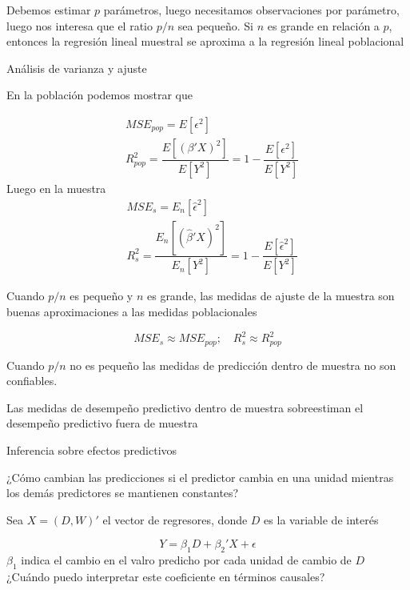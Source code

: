 \documentclass[aspectratio=169,xcolor=dvipsnames]{beamer}
\begin{document}
\begin{frame}
Debemos estimar $p$ parámetros, luego necesitamos observaciones por parámetro, luego nos interesa que el ratio $p/n$ sea pequeño. Si $n$ es grande en relación a $p$, entonces la regresión lineal muestral se aproxima a la regresión lineal poblacional
    
\end{frame}

\begin{frame}{Análisis de varianza y ajuste}

En la población podemos mostrar que 

\begin{align*}
    &MSE_{pop}=E[\epsilon^2]\\
    &R^2_{pop}=\dfrac{E[(\beta'X)^2]}{E[Y^2]}=1-\dfrac{E[\epsilon^2]}{E[Y^2]}
\end{align*}
Luego en la muestra
\begin{align*}
&MSE_{s}=E_n[\hat{\epsilon}^2]\\
    &R^2_{s}=\dfrac{E_n[(\hat{\beta}'X)^2]}{E_n[Y^2]}=1-\dfrac{E[\hat{\epsilon}^2]}{E[Y^2]}    
\end{align*}
   
\end{frame}

\begin{frame}
    Cuando $p/n$ es pequeño y $n$ es grande, las medidas de ajuste de la muestra son buenas aproximaciones a las medidas poblacionales

    \begin{equation*}
        MSE_s\approx MSE_{pop}; \quad R_s^2 \approx R_{pop}^2
    \end{equation*}

    
Cuando $p/n$ no es pequeño las medidas de predicción dentro de muestra no son confiables. 

Las medidas de desempeño predictivo dentro de muestra sobreestiman el desempeño predictivo fuera de muestra

\end{frame}


\begin{frame}{Inferencia sobre efectos predictivos}

¿Cómo cambian las predicciones si el predictor cambia en una unidad mientras los demás predictores se mantienen constantes?

\vspace{2mm}

Sea $X=(D,W)'$ el vector de regresores, donde $D$ es la variable de interés

\begin{equation*}
    Y=\beta_1D+\beta_2'X+\epsilon
\end{equation*}
    $\beta_1$ indica el cambio en el valro predicho por cada unidad de cambio de $D$ ¿Cuándo puedo interpretar este coeficiente en términos causales?
\end{frame}
\end{document}
